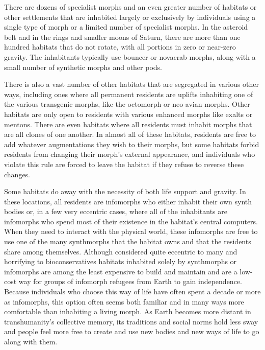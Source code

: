 There are dozens of specialist morphs and an even 
greater number of habitats or other settlements that 
are inhabited largely or exclusively by individuals 
using a single type of morph or a limited number of 
specialist morphs. In the asteroid belt and in the rings 
and smaller moons of Saturn, there are more than one 
hundred habitats that do not rotate, with all portions 
in zero or near-zero gravity. The inhabitants typically 
use bouncer or novacrab morphs, along with a small 
number of synthetic morphs and other pods.

There is also a vast number of other habitats that 
are segregated in various other ways, including ones 
where all permanent residents are uplifts inhabiting 
one of the various transgenic morphs, like the octomorph
or neo-avian morphs. Other habitats are only
open to residents with various enhanced morphs like 
exalts or mentons. There are even habitats where all 
residents must inhabit morphs that are all clones of 
one another. In almost all of these habitats, residents 
are free to add whatever augmentations they wish to 
their morphs, but some habitats forbid residents from 
changing their morph's external appearance, and individuals
who violate this rule are forced to leave the
habitat if they refuse to reverse these changes.

Some habitats do away with the necessity of 
both life support and gravity. In these locations, all 
residents are infomorphs who either inhabit their own 
synth bodies or, in a few very eccentric cases, where 
all of the inhabitants are infomorphs who spend most 
of their existence in the habitat's central computers. 
When they need to interact with the physical world, 
these infomorphs are free to use one of the many 
synthmorphs that the habitat owns and that the residents
share among themselves. Although considered
quite eccentric to many and horrifying to bioconservatives
habitats inhabited solely by synthmorphs or
infomorphs are among the least expensive to build 
and maintain and are a low-cost way for groups of 
infomorph refugees from Earth to gain independence. 
Because individuals who choose this way of life have 
often spent a decade or more as infomorphs, this 
option often seems both familiar and in many ways 
more comfortable than inhabiting a living morph. As 
Earth becomes more distant in transhumanity's collective
memory, its traditions and social norms hold less
sway and people feel more free to create and use new 
bodies and new ways of life to go along with them.

